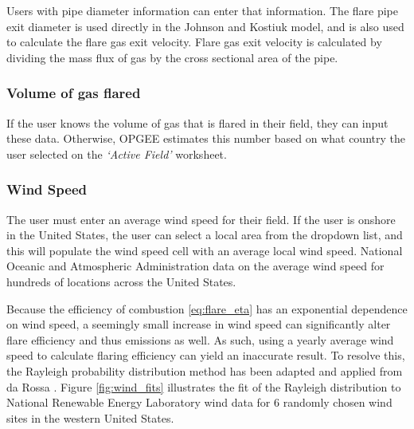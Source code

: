 \documentclass[11pt]{report}
\newcommand{\marg}[1]{{\footnotesize\textit{\textcolor{stanford}{'#1'}}}}
\newcommand{\marginnote}[1]{\marginpar{\marg{#1}}}
\newcommand{\sheet}[1]{\textit{`{#1}'}}
\begin{document}
Users with pipe diameter information can enter that information. \marginnote{Flaring \\ 2.2.3.2} The flare pipe exit diameter is used directly in the Johnson and Kostiuk model, and is also used to calculate the flare gas exit velocity. Flare gas exit velocity is calculated by dividing the mass flux of gas by the cross sectional area of the pipe. \marginnote{Flaring \\ 2.2.3.3}

\subsubsection{Volume of gas flared}
If the user knows the volume of gas that is flared in their field, they can input these data. \marginnote{Flaring \\ 1.3} Otherwise, OPGEE estimates this number based on what country the user selected on the \sheet{Active Field} worksheet. \marginnote{Flaring \\ Table 4.1}

\subsubsection{Wind Speed}
The user must enter an average wind speed for their field. \marginnote{Flaring \\ 2.3} If the user is onshore in the United States, the user can select a local area from the dropdown list, and this will populate the wind speed cell with an average local wind speed. National Oceanic and Atmospheric Administration data on the average wind speed for hundreds of locations across the United States. \marginnote{Flaring \\ Table 4.2}

Because the efficiency of combustion \eqref{eq:flare_eta} has an exponential dependence on wind speed, a seemingly small increase in wind speed can significantly alter flare efficiency and thus emissions as well. As such, using a yearly average wind speed to calculate flaring efficiency can yield an inaccurate result. To resolve this, the Rayleigh probability distribution method has been adapted and applied from da Rossa \cite{daRosa2012}. Figure \ref{fig:wind_fits} illustrates the fit of the Rayleigh distribution to National Renewable Energy Laboratory wind data for 6 randomly chosen wind sites in the western United States.
\end{document}
